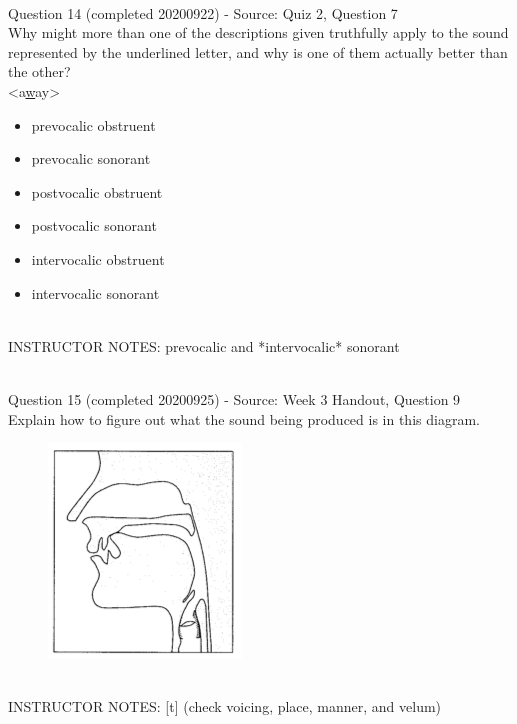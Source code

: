 \documentclass[12pt]{article}
\begin{document}
~\\

{\large Question 14} (completed 20200922) - Source: Quiz 2, Question 7\\

Why might more than one of the descriptions given truthfully apply to the sound represented by the underlined letter, and why is one of them actually better than the other?\\

<a\underline{w}ay>

\begin{itemize} \item prevocalic obstruent \item prevocalic sonorant \item postvocalic obstruent \item postvocalic sonorant \item intervocalic obstruent \item intervocalic sonorant \end{itemize}


~\\
INSTRUCTOR NOTES: prevocalic and *intervocalic* sonorant


~\\

{\large Question 15} (completed 20200925) - Source: Week 3 Handout, Question 9\\

Explain how to figure out what the sound being produced is in this diagram.\\

\begin{figure}[H]
\includegraphics{../images/sagittal_t.png}
\end{figure}

~\\
INSTRUCTOR NOTES: [t] (check voicing, place, manner, and velum)


~\\
\end{document}
